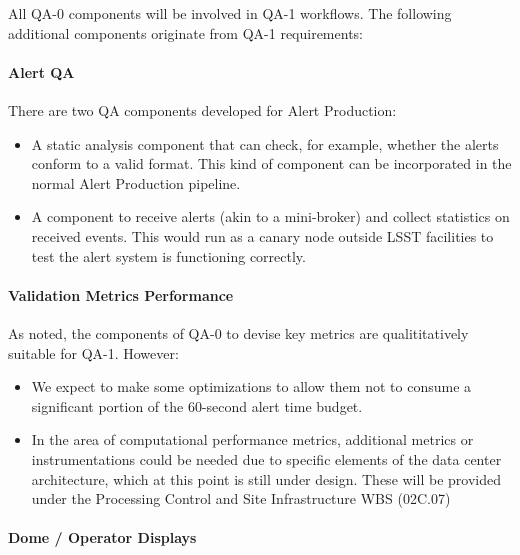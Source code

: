 All QA-0 components will be involved in QA-1 workflows. The following additional components originate from QA-1 requirements:

\paragraph{Alert QA}
\label{sec:qaAlertQA}

There are two QA components developed for Alert Production:

\begin{itemize}

\item A static analysis component that can check, for example, whether the alerts conform to a valid format. This kind of component can be incorporated in the normal Alert Production pipeline.

\item A component to receive alerts (akin to a mini-broker) and collect statistics on received events. This would run as a canary node outside LSST facilities to test the alert system is functioning correctly.

\end{itemize}

\paragraph{Validation Metrics Performance}
\label{sec:qaPerfValidate}

As noted, the components of QA-0 to devise key metrics are
qualititatively suitable for QA-1. However:

\begin{itemize}

\item We expect to make some optimizations to allow them not to consume a significant portion of the 60-second alert time budget.

\item In the area of computational performance metrics, additional metrics or instrumentations could be needed due to specific elements of the data center architecture, which at this point is still under design. These will be provided under the Processing Control and Site Infrastructure WBS (02C.07)

\end{itemize}

\paragraph{Dome / Operator Displays}
\label{sec:qaDomeDisplay}

